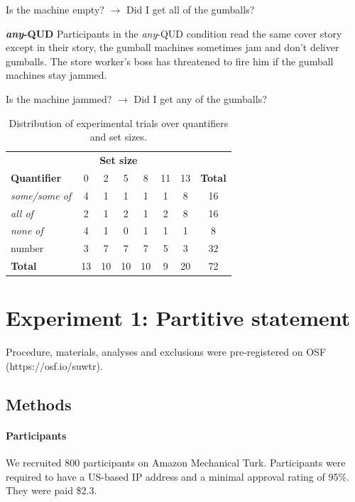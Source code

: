 \documentclass[10pt,letterpaper]{article}
\begin{document}
\begin{center}Is the machine empty? $\rightarrow$ Did I get all of the gumballs?\end{center}

\textbf{\textit{any}-QUD} Participants in the \textit{any}-QUD condition read the same cover story except in their story, the gumball machines sometimes jam and don't deliver gumballs. The store worker's boss has threatened to fire him if the gumball machines stay jammed.

\begin{center}Is the machine jammed? $\rightarrow$ Did I get any of the gumballs?\end{center}

  \begin{table}
      \begin{tabular}{lccccccc}
      \toprule
      \multicolumn{8}{c}{\textbf{Set size}} \\
      \textbf{Quantifier} & 0 & 2 & 5 & 8 & 11 & 13 & \multicolumn{1}{l}{\textbf{Total}} \\
      \midrule
      \textit{some/some of} & 4 & 1 & 1 & 1 & 1 & 8 & 16 \\
      \textit{all of} & 2 & 1 & 2 & 1 & 2 & 8 & 16 \\
      \textit{none of} & 4 & 1 & 0 & 1 & 1 & 1 & 8 \\
      number & 3 & 7 & 7 & 7 & 5 & 3 & 32 \\
      \bottomrule
      \textbf{Total} & 13 & 10 & 10 & 10 & 9 & 20 & 72
      \end{tabular}
    \caption{Distribution of experimental trials over quantifiers and set sizes.\label{tab:stimuli}}
  \end{table}

\section{Experiment 1: Partitive statement}

Procedure, materials, analyses and exclusions were pre-registered on OSF (https://osf.io/suwtr).

\subsection{Methods}

\paragraph{Participants}
We recruited 800 participants on Amazon Mechanical Turk. Participants were required to have a US-based IP address and a minimal approval rating of 
95\%. They were paid \$2.3.
\end{document}
